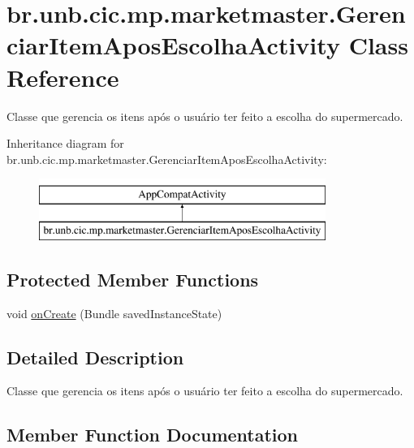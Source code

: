 \hypertarget{classbr_1_1unb_1_1cic_1_1mp_1_1marketmaster_1_1GerenciarItemAposEscolhaActivity}{}\section{br.\+unb.\+cic.\+mp.\+marketmaster.\+Gerenciar\+Item\+Apos\+Escolha\+Activity Class Reference}
\label{classbr_1_1unb_1_1cic_1_1mp_1_1marketmaster_1_1GerenciarItemAposEscolhaActivity}


Classe que gerencia os itens após o usuário ter feito a escolha do supermercado.  


Inheritance diagram for br.\+unb.\+cic.\+mp.\+marketmaster.\+Gerenciar\+Item\+Apos\+Escolha\+Activity\+:\begin{figure}[H]
\begin{center}
\leavevmode
\includegraphics[height=2.000000cm]{classbr_1_1unb_1_1cic_1_1mp_1_1marketmaster_1_1GerenciarItemAposEscolhaActivity}
\end{center}
\end{figure}
\subsection*{Protected Member Functions}
\begin{DoxyCompactItemize}
\item 
void \mbox{\hyperlink{classbr_1_1unb_1_1cic_1_1mp_1_1marketmaster_1_1GerenciarItemAposEscolhaActivity_aa92091ef01049e5d86ba755fc8c8d3ab}{on\+Create}} (Bundle saved\+Instance\+State)
\end{DoxyCompactItemize}


\subsection{Detailed Description}
Classe que gerencia os itens após o usuário ter feito a escolha do supermercado. 

\subsection{Member Function Documentation}
\mbox{\label{classbr_1_1unb_1_1cic_1_1mp_1_1marketmaster_1_1GerenciarItemAposEscolhaActivity_aa92091ef01049e5d86ba755fc8c8d3ab}} 
